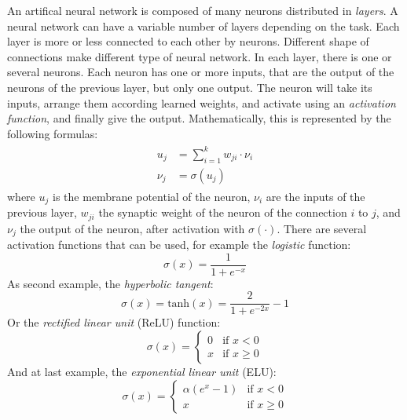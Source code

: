 An artifical neural network is composed of many neurons distributed in \emph{layers}. A neural network can have a variable number of layers depending on the task. Each layer is more or less connected to each other by neurons. Different shape of connections make different type of neural network. In each layer, there is one or several neurons. Each neuron has one or more inputs, that are the output of the neurons of the previous layer, but only one output. The neuron will take its inputs, arrange them according learned weights, and activate using an \emph{activation function}, and finally give the output. Mathematically, this is represented by the following formulas:
\begin{align}
  \begin{split}
    u_j &= \sum^k_{i=1} w_{ji} \cdot \nu_i \\
    \nu_j &= \sigma(u_j)
  \end{split}
\end{align}
where $u_j$ is the membrane potential of the neuron, $\nu_i$ are the inputs of the previous layer, $w_{ji}$ the synaptic weight of the neuron of the connection $i$ to $j$, and $\nu_j$ the output of the neuron, after activation with $\sigma(\cdot)$. There are several activation functions that can be used, for example the \emph{logistic} function:
\begin{equation}
  \sigma(x) = \frac{1}{1 + e^{-x}}
\end{equation}
As second example, the \emph{hyperbolic tangent}:
\begin{equation}
  \sigma(x) = \text{tanh}(x) = \frac{2}{1 + e^{-2x}} - 1
\end{equation}
Or the \emph{rectified linear unit} (ReLU) function:
\begin{equation}
  \label{eq:relu}
  \sigma(x) = \begin{cases}
    0 & \text{if } x < 0 \\
    x & \text{if } x \geq 0
  \end{cases}
\end{equation}
And at last example, the \emph{exponential linear unit} (ELU):
\begin{equation}
  \label{eq:elu}
  \sigma(x) = \begin{cases}
    \alpha (e^{x} - 1) & \text{if } x < 0 \\
    x & \text{if } x \geq 0
  \end{cases}
\end{equation}
